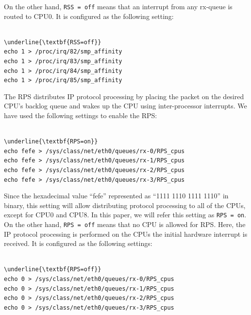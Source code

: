 On the other hand, {\tt RSS = off} means that an interrupt from any rx-queue is routed to CPU0. 
It is configured as the following setting:

\begin{center}
\begin{minipage}{0.8\columnwidth}
\begin{Verbatim}[commandchars=\\\{\}]

\underline{\textbf{RSS=off}}
echo 1 > /proc/irq/82/smp_affinity
echo 1 > /proc/irq/83/smp_affinity
echo 1 > /proc/irq/84/smp_affinity
echo 1 > /proc/irq/85/smp_affinity

\end{Verbatim}
\end{minipage}
\end{center}


The RPS distributes IP protocol processing by placing the packet
on the desired CPU's backlog queue and wakes up the CPU using inter-processor interrupts.
We have used the following settings to enable the RPS:

\begin{center}
\begin{minipage}{0.95\columnwidth}
\begin{Verbatim}[commandchars=\\\{\}]

\underline{\textbf{RPS=on}}
echo fefe > /sys/class/net/eth0/queues/rx-0/RPS_cpus
echo fefe > /sys/class/net/eth0/queues/rx-1/RPS_cpus
echo fefe > /sys/class/net/eth0/queues/rx-2/RPS_cpus
echo fefe > /sys/class/net/eth0/queues/rx-3/RPS_cpus

\end{Verbatim}
\end{minipage}
\end{center}

Since the hexadecimal value \enquote{fefe} represented as \enquote{1111 1110 1111 1110} in binary, 
this setting will allow distributing protocol processing to all of the CPUs, except for CPU0 and CPU8.
In this paper, we will refer this setting as {\tt RPS = on}.
%
On the other hand, {\tt RPS = off} means that no CPU is allowed for RPS. 
Here, the IP protocol processing is performed on the CPUs the initial hardware interrupt is received.
It is configured as the following settings:

\begin{center}
\begin{minipage}{0.9\columnwidth}
\begin{Verbatim}[commandchars=\\\{\}]

\underline{\textbf{RPS=off}}
echo 0 > /sys/class/net/eth0/queues/rx-0/RPS_cpus
echo 0 > /sys/class/net/eth0/queues/rx-1/RPS_cpus
echo 0 > /sys/class/net/eth0/queues/rx-2/RPS_cpus
echo 0 > /sys/class/net/eth0/queues/rx-3/RPS_cpus

\end{Verbatim}
\end{minipage}
\end{center}

